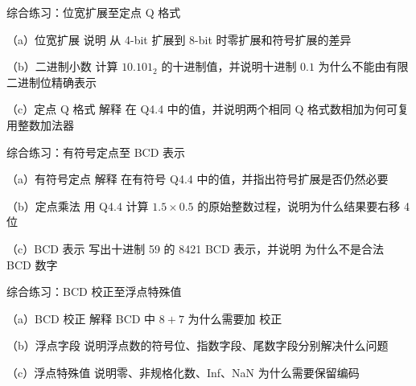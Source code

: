 \begin{chapterexercise}{综合练习：位宽扩展至定点 Q 格式}
\begin{exercisesubproblem}{（a）位宽扩展}
说明  从 4-bit 扩展到 8-bit 时零扩展和符号扩展的差异
\end{exercisesubproblem}
\begin{exercisesubproblem}{（b）二进制小数}
计算 $10.101_2$ 的十进制值，并说明十进制 $0.1$ 为什么不能由有限二进制位精确表示
\end{exercisesubproblem}
\begin{exercisesubproblem}{（c）定点 Q 格式}
解释  在 Q4.4 中的值，并说明两个相同 Q 格式数相加为何可复用整数加法器
\end{exercisesubproblem}
\end{chapterexercise}

\begin{chapterexercise}{综合练习：有符号定点至 BCD 表示}
\begin{exercisesubproblem}{（a）有符号定点}
解释  在有符号 Q4.4 中的值，并指出符号扩展是否仍然必要
\end{exercisesubproblem}
\begin{exercisesubproblem}{（b）定点乘法}
用 Q4.4 计算 $1.5 \times 0.5$ 的原始整数过程，说明为什么结果要右移 4 位
\end{exercisesubproblem}
\begin{exercisesubproblem}{（c）BCD 表示}
写出十进制 59 的 8421 BCD 表示，并说明  为什么不是合法 BCD 数字
\end{exercisesubproblem}
\end{chapterexercise}

\begin{chapterexercise}{综合练习：BCD 校正至浮点特殊值}
\begin{exercisesubproblem}{（a）BCD 校正}
解释 BCD 中 $8+7$ 为什么需要加  校正
\end{exercisesubproblem}
\begin{exercisesubproblem}{（b）浮点字段}
说明浮点数的符号位、指数字段、尾数字段分别解决什么问题
\end{exercisesubproblem}
\begin{exercisesubproblem}{（c）浮点特殊值}
说明零、非规格化数、Inf、NaN 为什么需要保留编码
\end{exercisesubproblem}
\end{chapterexercise}

